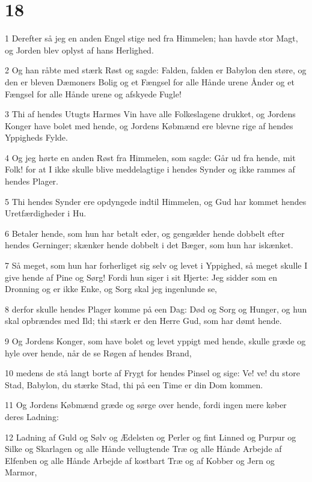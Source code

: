 \chapter{18}

\par 1 Derefter så jeg en anden Engel stige ned fra Himmelen; han havde stor Magt, og Jorden blev oplyst af hans Herlighed.
\par 2 Og han råbte med stærk Røst og sagde: Falden, falden er Babylon den støre, og den er bleven Dæmoners Bolig og et Fængsel for alle Hånde urene Ånder og et Fængsel for alle Hånde urene og afskyede Fugle!
\par 3 Thi af hendes Utugts Harmes Vin have alle Folkeslagene drukket, og Jordens Konger have bolet med hende, og Jordens Købmænd ere blevne rige af hendes Yppigheds Fylde.
\par 4 Og jeg hørte en anden Røst fra Himmelen, som sagde: Går ud fra hende, mit Folk! for at I ikke skulle blive meddelagtige i hendes Synder og ikke rammes af hendes Plager.
\par 5 Thi hendes Synder ere opdyngede indtil Himmelen, og Gud har kommet hendes Uretfærdigheder i Hu.
\par 6 Betaler hende, som hun har betalt eder, og gengælder hende dobbelt efter hendes Gerninger; skænker hende dobbelt i det Bæger, som hun har iskænket.
\par 7 Så meget, som hun har forherliget sig selv og levet i Yppighed, så meget skulle I give hende af Pine og Sørg! Fordi hun siger i sit Hjerte: Jeg sidder som en Dronning og er ikke Enke, og Sorg skal jeg ingenlunde se,
\par 8 derfor skulle hendes Plager komme på een Dag: Død og Sorg og Hunger, og hun skal opbrændes med Ild; thi stærk er den Herre Gud, som har dømt hende.
\par 9 Og Jordens Konger, som have bolet og levet yppigt med hende, skulle græde og hyle over hende, når de se Røgen af hendes Brand,
\par 10 medens de stå langt borte af Frygt for hendes Pinsel og sige: Ve! ve! du store Stad, Babylon, du stærke Stad, thi på een Time er din Dom kommen.
\par 11 Og Jordens Købmænd græde og sørge over hende, fordi ingen mere køber deres Ladning:
\par 12 Ladning af Guld og Sølv og Ædelsten og Perler og fint Linned og Purpur og Silke og Skarlagen og alle Hånde vellugtende Træ og alle Hånde Arbejde af Elfenben og alle Hånde Arbejde af kostbart Træ og af Kobber og Jern og Marmor,
